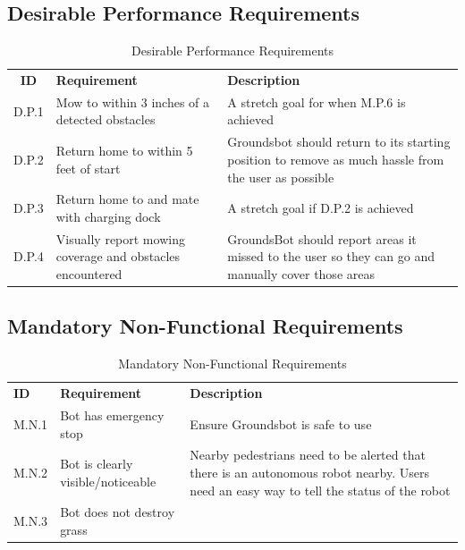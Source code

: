 \documentclass{article}
\begin{document}
\subsection{Desirable Performance Requirements}
\begin{center}
  \begin{table}[H]
  \caption{Desirable Performance Requirements}
  \label{table: desirable performance}
  \def\arraystretch{1.5}
  \begin{tabularx}{\textwidth}{ cXX }
	  \textbf{ID} & \textbf{Requirement} & \textbf{Description} \\
	  D.P.1 &
	  Mow to within 3 inches of a detected obstacles &
	  A stretch goal for when M.P.6 is achieved \\
  	  D.P.2 &
  	  Return home to within 5 feet of start &
  	  Groundsbot should return to its starting position to remove as much hassle from the user as possible \\
  	  D.P.3 &
  	  Return home to and mate with charging dock &
  	  A stretch goal if D.P.2 is achieved \\
  	  D.P.4 &
  	  Visually report mowing coverage and obstacles encountered &
  	  GroundsBot should report areas it missed to the user so they can go and manually cover those areas \\
  \end{tabularx}
  \end{table}
\end{center}

\subsection{Mandatory Non-Functional Requirements}
\begin{center}
  \begin{table}
    \caption{Mandatory Non-Functional Requirements}
    \label{table: mandatory non-functional}
    \def\arraystretch{1.5}
    \begin{tabularx}{\textwidth}{ lXX }
  	 \textbf{ID} & \textbf{Requirement} & \textbf{Description} \\
  	  M.N.1 &
  	  Bot has emergency stop &
  	  Ensure Groundsbot is safe to use\\
  	  M.N.2 &
  	  Bot is clearly visible/noticeable &
  	  Nearby pedestrians need to be alerted that there is an autonomous robot nearby. Users need an easy way to tell the status of the robot\\
  	  M.N.3 &
  	  Bot does not destroy grass &
  	  \\
  	\end{tabularx}
  \end{table}
\end{center}
\end{document}
